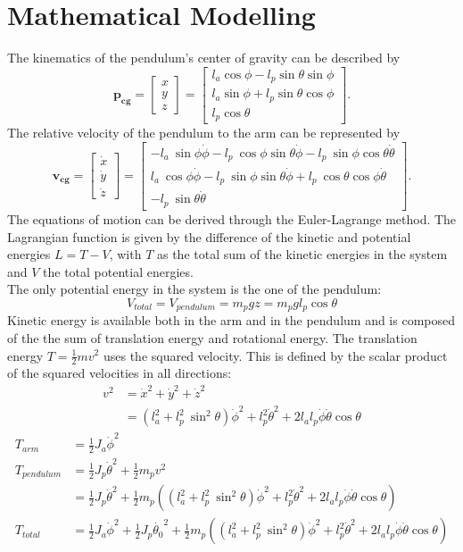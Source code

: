 \section{Mathematical Modelling} 
The kinematics of the pendulum's 
center of gravity can be described by 
\[\mathbf{p_{cg}}=\begin{bmatrix}
x	\\ 
y	\\ 
z	
	\end{bmatrix} =\begin{bmatrix}
l_a\cos\phi-l_{p}\sin\theta\sin\phi \\ 
l_a\sin\phi+l_{p}\sin\theta\cos\phi \\ 
l_{p}\cos\theta
\end{bmatrix}. \] 
The relative velocity of the pendulum to the arm can be represented by 
\[\mathbf{v_{cg}}= \begin{bmatrix}
\dot{x}\\
\dot{y}\\
\dot{z}\end{bmatrix}=\begin{bmatrix}
-l_a\ \sin \phi \dot{\phi}-l_{p}\ \cos\phi \sin\theta\dot{\phi}-l_{p} 
\ \sin\phi \cos\theta\dot{\theta} \\ 
l_a\ \cos\phi\dot{\phi}-l_{p} \ \sin\phi \sin\theta\dot{\phi}+l_{p} 
\ \cos\theta \cos\phi\dot{\theta} \\
-l_{p} \ \sin\theta\dot{\theta}
\end{bmatrix}.\]
The equations of motion can be derived through the Euler-Lagrange 
method. The Lagrangian function is given by the difference of the 
kinetic and potential energies $L=T-V$, with $T$ as the total sum of the 
kinetic energies in the system and $V$ the total potential energies.\\
The only potential energy in the system is the one of the pendulum:
\[V_{total}=V_{pendulum}=m_pgz= m_pgl_{p}\cos\theta\]
Kinetic energy is available both in the arm and in the pendulum and is composed 
of the the sum of translation energy and rotational energy. The translation 
energy $T=\frac{1}{2}mv^2$ uses the squared velocity. This is defined by  the 
scalar product 
of the squared velocities in all directions:
\begin{align*}v^2&=\dot{x}^2+\dot{y}^2+\dot{z}^2\\
&=(l_a^2+l_p^2\ 
\sin^2\theta)\dot{\phi}^2+l_p^2\dot{\theta}^2+2l_al_p\dot{\phi}\dot{\theta}\cos 
\theta\end{align*} 
\begin{align*}
T_{arm}&=\frac{1}{2}J_a\dot{\phi}^2\\
T_{pendulum}&=\frac{1}{2}J_p\dot{\theta}^2+\frac{1}{2}m_pv^2\\
&= \frac{1}{2}J_p\dot{\theta}^2+\frac{1}{2}m_p\left((l_a^2+l_p^2\ 
\sin^2\theta)\dot{\phi}^2+l_p^2\dot{\theta}^2+2l_al_p\dot{\phi}\dot{\theta}\cos 
\theta\right)\\
T_{total}&= 
\frac{1}{2}J_a\dot{\phi}^2+\frac{1}{2}J_p\dot{\theta_0}^2+\frac{1}{2}m_p\left((l_a^2+l_p^2\
\sin^2\theta)\dot{\phi}^2+l_p^2\dot{\theta}^2+2l_al_p\dot{\phi}\dot{\theta}\cos 
\theta\right)
\end{align*}
